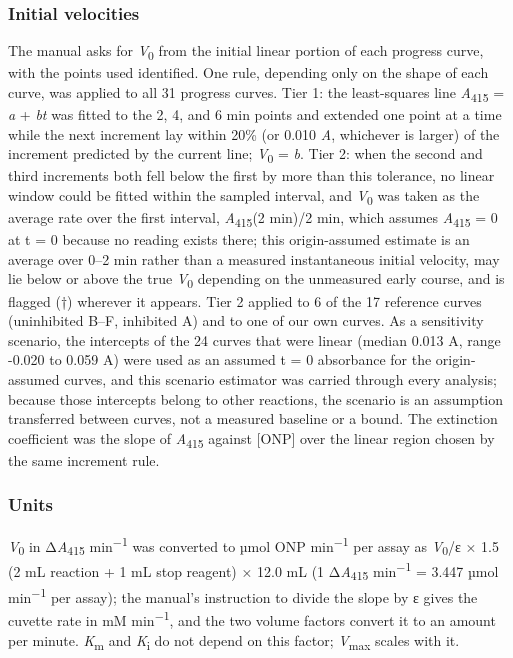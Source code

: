 \documentclass[9pt,twocolumn]{extarticle}
\newcommand{\Km}{\textit{K}\textsubscript{m}}
\newcommand{\Vmax}{\textit{V}\textsubscript{max}}
\newcommand{\Vo}{\textit{V}\textsubscript{0}}
\newcommand{\Ki}{\textit{K}\textsubscript{i}}
\newcommand{\Aa}{\textit{A}\textsubscript{415}}
\newcommand{\dAa}{Δ\textit{A}\textsubscript{415}}
\newcommand{\permin}{min\textsuperscript{−1}}
\newcommand{\umolmin}{µmol min\textsuperscript{−1}}
\newcommand{\dash}{–}
\begin{document}
\subsubsection{Initial velocities}
The manual asks for \Vo{} from the initial linear portion of each progress curve, with the points used identified. One rule, depending only on the shape of each curve, was applied to all 31 progress curves. Tier 1: the least-squares line \Aa{} = \textit{a} + \textit{bt} was fitted to the 2, 4, and 6 min points and extended one point at a time while the next increment lay within 20\% (or 0.010 \textit{A}, whichever is larger) of the increment predicted by the current line; \Vo{} = \textit{b}. Tier 2: when the second and third increments both fell below the first by more than this tolerance, no linear window could be fitted within the sampled interval, and \Vo{} was taken as the average rate over the first interval, \Aa(2 min)/2 min, which assumes \Aa{} = 0 at t = 0 because no reading exists there; this origin-assumed estimate is an average over 0\dash 2 min rather than a measured instantaneous initial velocity, may lie below or above the true \Vo{} depending on the unmeasured early course, and is flagged (†) wherever it appears. Tier 2 applied to 6 of the 17 reference curves (uninhibited B\dash F, inhibited A) and to one of our own curves. As a sensitivity scenario, the intercepts of the 24 curves that were linear (median 0.013 A, range -0.020 to 0.059 A) were used as an assumed t = 0 absorbance for the origin-assumed curves, and this scenario estimator was carried through every analysis; because those intercepts belong to other reactions, the scenario is an assumption transferred between curves, not a measured baseline or a bound. The extinction coefficient was the slope of \Aa{} against [ONP] over the linear region chosen by the same increment rule.
\subsubsection{Units}
\Vo{} in \dAa{} \permin{} was converted to µmol ONP \permin{} per assay as \Vo/ε × 1.5 (2 mL reaction + 1 mL stop reagent) × 12.0 mL (1 \dAa{} \permin{} = 3.447 \umolmin{} per assay); the manual's instruction to divide the slope by ε gives the cuvette rate in mM \permin, and the two volume factors convert it to an amount per minute. \Km{} and \Ki{} do not depend on this factor; \Vmax{} scales with it.
\end{document}
